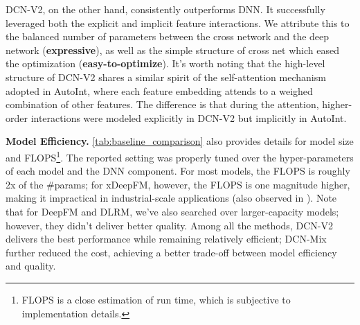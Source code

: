\documentclass[sigconf]{acmart}
\begin{document}
{DCN-V2}, on the other hand, consistently outperforms DNN. It successfully leveraged both the explicit and implicit feature interactions. We attribute this to the balanced number of parameters between the cross network and the deep network ({\bf expressive}), as well as the simple structure of cross net which eased the optimization ({\bf easy-to-optimize}). It's worth noting that the high-level structure of {DCN-V2} shares a similar spirit of the self-attention mechanism adopted in AutoInt, where each feature embedding attends to a weighed combination of other features. The difference is that during the attention, higher-order interactions were modeled explicitly in {DCN-V2} but implicitly in AutoInt.

{\bf Model Efficiency.} \autoref{tab:baseline_comparison} also provides details for model size and FLOPS\footnote{FLOPS is a close estimation of run time, which is subjective to implementation details.}. The reported setting was properly tuned over the hyper-parameters of each model and the DNN component. For most models, the FLOPS is roughly 2x of the \#params; for xDeepFM, however, the FLOPS is one magnitude higher, making it impractical in industrial-scale applications (also observed in \cite{song2019autoint}). Note that for DeepFM and DLRM, we've also searched over larger-capacity models; however, they didn't deliver better quality. Among all the methods, {DCN-V2} delivers the best performance while remaining relatively efficient; {DCN-Mix} further reduced the cost, achieving a better trade-off between model efficiency and quality.
\end{document}
